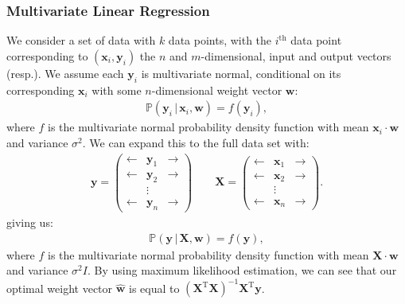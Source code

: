 \subsubsection{Multivariate Linear Regression}

We consider a set of data with $k$ data points, with
the $i^{\text{th}}$ data point corresponding to 
$(\mathbf{x}_i,\mathbf{y}_i)$ the $n$ and $m$-dimensional,
input and output vectors (resp.). We assume each $\mathbf{y}_i$
is multivariate normal, conditional on its corresponding 
$\mathbf{x}_i$ with some $n$-dimensional weight vector 
$\mathbf{w}$: \begin{gather*}
    \mathbb{P}(\mathbf{y}_i \, | \, \mathbf{x}_i, \mathbf{w})
    = f(\mathbf{y}_i),
\end{gather*} where $f$ is the multivariate normal probability
density function with mean $\mathbf{x}_i \cdot \mathbf{w}$ and
variance $\sigma^2$. We can expand this to the full data set 
with: \begin{gather*}
    \mathbf{y} = \begin{pmatrix}
        \leftarrow & \mathbf{y}_1 & \rightarrow \\
        \leftarrow & \mathbf{y}_2 & \rightarrow \\
                   & \vdots &          \\
        \leftarrow & \mathbf{y}_n & \rightarrow
    \end{pmatrix}
    \qquad
    \mathbf{X} = \begin{pmatrix}
        \leftarrow & \mathbf{x}_1 & \rightarrow \\
        \leftarrow & \mathbf{x}_2 & \rightarrow \\
                   & \vdots &                   \\
        \leftarrow & \mathbf{x}_n & \rightarrow
    \end{pmatrix}.
\end{gather*} 
giving us: \begin{gather} \label{multivarlinreg}
    \mathbb{P}(\mathbf{y} \, | \, \mathbf{X}, \mathbf{w}) 
    = f(\mathbf{y}),
\end{gather} where $f$ is the multivariate normal probability
density function with mean $\mathbf{X} \cdot \mathbf{w}$ and
variance $\sigma^2 I$. By using maximum likelihood estimation,
we can see that our optimal weight vector $\mathbf{\hat{w}}$
is equal to $(\mathbf{X}^{\text{T}}\mathbf{X})^{-1}
\mathbf{X}^{\text{T}}\mathbf{y}$.

\newpage


